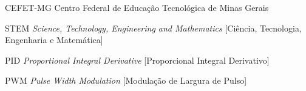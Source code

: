 \begin{siglas}
  \item[CEFET-MG] Centro Federal de Educação Tecnológica de Minas Gerais
  \item[STEM] \textit{Science, Technology, Engineering and Mathematics} [Ciência, Tecnologia, Engenharia e Matemática]
  \item[PID] \textit{Proportional Integral Derivative} [Proporcional Integral Derivativo]
  \item[PWM] \textit{Pulse Width Modulation} [Modulação de Largura de Pulso]  
\end{siglas}


\tableofcontents*
\cleardoublepage
